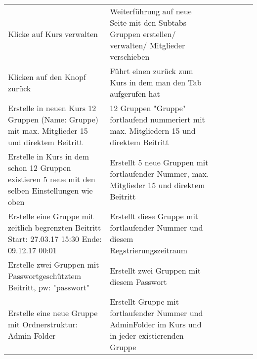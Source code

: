 \begin{table}[]
\begin{tabular}{p{6cm}p{7cm}p{3cm}llll}
		Klicke auf Kurs verwalten                                                                                                            & Weiterführung auf neue Seite mit den Subtabs Gruppen erstellen/ verwalten/ Mitglieder verschieben                                                                & \checkmark           &  &  &  \\
		Klicken auf den Knopf zurück                                                                                                         & Führt einen zurück zum Kurs in dem man den Tab aufgerufen hat                                                                                                    & 
		\checkmark          &  &  &  \\
		Erstelle in neuen Kurs 12 Gruppen (Name: Gruppe) mit max. Mitglieder 15 und direktem Beitritt                                        & 12 Gruppen "Gruppe" fortlaufend nummeriert mit max. Mitgliedern 15 und direktem Beitritt                                                                         & \checkmark           &  &  &  \\
		Erstelle in Kurs in dem schon 12 Gruppen existieren 5 neue mit den selben Einstellungen wie oben                                     & Erstellt 5 neue Gruppen mit fortlaufender Nummer, max. Mitglieder 15 und direktem Beitritt                                                                        & \checkmark           &  &  &  \\
		Erstelle eine Gruppe mit zeitlich begrenzten Beitritt Start: 27.03.17 15:30 Ende: 09.12.17 00:01                                     & Erstellt diese Gruppe mit fortlaufender Nummer und diesem Regstrierungszeitraum                                                                                   & \checkmark           &  &  &  \\
		Erstelle zwei Gruppen mit Passwortgeschütztem Beitritt, pw: "passwort"                                                               & Erstellt zwei Gruppen mit diesem Passwort                                                                                                                        & \checkmark          &  &  &  \\
		Erstelle eine neue Gruppe mit Ordnerstruktur: Admin Folder                                                                           & Erstellt Gruppe mit fortlaufender Nummer und AdminFolder im Kurs und in jeder existierenden Gruppe                                                               & \checkmark           &  &  &  \\

\end{tabular}
\end{table}

